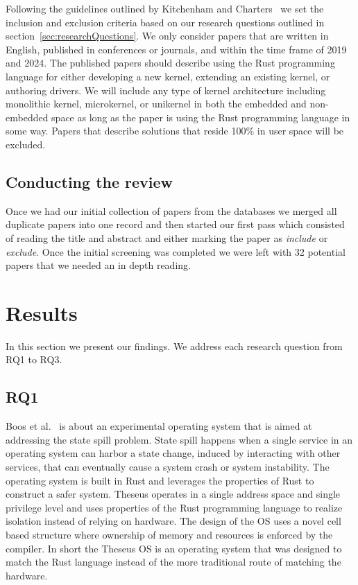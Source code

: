 \documentclass[sigconf]{acmart}
\begin{document}
Following the guidelines outlined by Kitchenham and Charters~\cite{Stuart2007-cc} we set the
inclusion and exclusion criteria based on our research questions outlined in
section~\ref{sec:researchQuestions}. We only consider papers that are written in English, published
in conferences or journals, and within the time frame of 2019 and 2024. The published papers should
describe using the Rust programming language for either developing a new kernel, extending an
existing kernel, or authoring drivers. We will include any type of kernel architecture including
monolithic kernel, microkernel, or unikernel in both the embedded and non-embedded space as long as
the paper is using the Rust programming language in some way. Papers that describe solutions that
reside 100\% in user space will be excluded.

\subsection{Conducting the review}

Once we had our initial collection of papers from the databases we merged all duplicate
papers into one record and then started our first pass which consisted of reading the title and
abstract and either marking the paper as \textit{include} or \textit{exclude}.
Once  the initial screening was completed we were left with 32 potential papers that
we needed an in depth reading.

\section{Results}

In this section we present our findings. We address each research question from RQ1 to RQ3.

\subsection{RQ1}

Boos et al.~\cite{Boos2020-zh} is about an experimental operating system that is aimed at addressing
the state spill problem. State spill happens when a single service in an operating system can harbor
a state change, induced by interacting with other services, that can eventually cause a system crash
or system instability. The operating system is built in Rust and leverages the properties of Rust to
construct a safer system. Theseus operates in a single address space and single privilege level and
uses properties of the Rust programming language to realize isolation instead of relying on
hardware. The design of the OS uses a novel cell based structure where ownership of memory and
resources is enforced by the compiler. In short the Theseus OS is an operating system that was
designed to match the Rust language instead of the more traditional route of matching the hardware.
\end{document}
